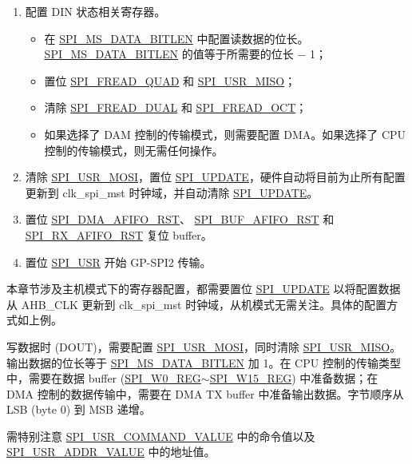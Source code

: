 \documentclass[main\_\_CN.tex]{subfiles}
\begin{document}
\begin{enumerate}
    \item 配置 DIN 状态相关寄存器。
        \begin{itemize}
            \item 在 \hyperref[fielddesc:SPIMSDATABITLEN]{SPI\_MS\_DATA\_BITLEN} 中配置读数据的位长。 \hyperref[fielddesc:SPIMSDATABITLEN]{SPI\_MS\_DATA\_BITLEN} 的值等于所需要的位长 $-$ 1；
            \item 置位 \hyperref[fielddesc:SPIFREADQUAD]{SPI\_FREAD\_QUAD} 和 \hyperref[fielddesc:SPIUSRMISO]{SPI\_USR\_MISO}；
            \item 清除 \hyperref[fielddesc:SPIFREADDUAL]{SPI\_FREAD\_DUAL} 和 \hyperref[fielddesc:SPIFREADOCT]{SPI\_FREAD\_OCT}；
            \item 如果选择了 DAM 控制的传输模式，则需要配置 DMA。如果选择了 CPU 控制的传输模式，则无需任何操作。
        \end{itemize}   
    
    \item 清除 \hyperref[fielddesc:SPIUSRMOSI]{SPI\_USR\_MOSI}，置位 \hyperref[fielddesc:SPIUPDATE]{SPI\_UPDATE}，硬件自动将目前为止所有配置更新到 clk\_spi\_mst 时钟域，并自动清除 \hyperref[fielddesc:SPIUPDATE]{SPI\_UPDATE}。
    \item 置位 \hyperref[fielddesc:SPIDMAAFIFORST]{SPI\_DMA\_AFIFO\_RST}、 \hyperref[fielddesc:SPIBUFAFIFORST]{SPI\_BUF\_AFIFO\_RST} 和 \hyperref[fielddesc:SPIRXAFIFORST]{SPI\_RX\_AFIFO\_RST} 复位 buffer。
    \item 置位 \hyperref[fielddesc:SPIUSR]{SPI\_USR} 开始 GP-SPI2 传输。
\end{enumerate}

\begin{tiplisting}
本章节涉及主机模式下的寄存器配置，都需要置位 \hyperref[fielddesc:SPIUPDATE]{SPI\_UPDATE} 以将配置数据从 AHB\_CLK 更新到 clk\_spi\_mst 时钟域，从机模式无需关注。具体的配置方式如上例。
\end{tiplisting}

写数据时 (DOUT)，需要配置 \hyperref[fielddesc:SPIUSRMOSI]{SPI\_USR\_MOSI}，同时清除 \hyperref[fielddesc:SPIUSRMISO]{SPI\_USR\_MISO}。输出数据的位长等于 \hyperref[fielddesc:SPIMSDATABITLEN]{SPI\_MS\_DATA\_BITLEN} 加 1。在 CPU 控制的传输类型中，需要在数据 buffer (\hyperref[regdesc:SPIW0REG]{SPI\_W0\_REG}$\sim$\hyperref[regdesc:SPIW15REG]{SPI\_W15\_REG}) 中准备数据；在 DMA 控制的数据传输中，需要在 DMA TX buffer 中准备输出数据。字节顺序从 LSB (byte 0) 到 MSB 递增。

需特别注意 \hyperref[fielddesc:SPIUSRCOMMANDVALUE]{SPI\_USR\_COMMAND\_VALUE} 中的命令值以及 \hyperref[fielddesc:SPIUSRADDRVALUE]{SPI\_USR\_ADDR\_VALUE} 中的地址值。 
\end{document}
